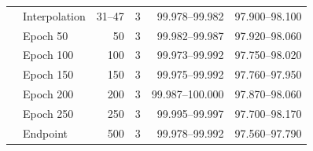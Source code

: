 \begin{table}[!htbp]
\begin{tabular}{llrrrr}
 & Interpolation & 31--47 & 3 & 99.978--99.982 & 97.900--98.100\\
 & Epoch 50 & 50 & 3 & 99.982--99.987 & 97.920--98.060\\
 & Epoch 100 & 100 & 3 & 99.973--99.992 & 97.750--98.020\\
 & Epoch 150 & 150 & 3 & 99.975--99.992 & 97.760--97.950\\
 & Epoch 200 & 200 & 3 & 99.987--100.000 & 97.870--98.060\\
 & Epoch 250 & 250 & 3 & 99.995--99.997 & 97.700--98.170\\
 & Endpoint & 500 & 3 & 99.978--99.992 & 97.560--97.790\\
\bottomrule\end{tabular}\end{table}

\FloatBarrier
